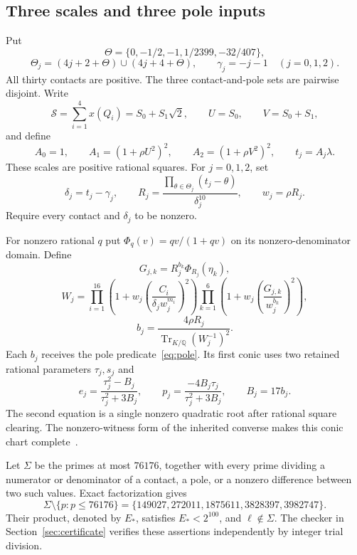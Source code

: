 \documentclass[11pt,a4paper]{article}
\newcommand{\Q}{\mathbb Q}\newcommand{\Z}{\mathbb Z}
\DeclareMathOperator{\Tr}{Tr}\DeclareMathOperator{\Nm}{N}
\begin{document}
\subsection{Three scales and three pole inputs}

Put
\[
 \Theta=\{0,-1/2,-1,1/2399,-32/407\},
\]
\[
 \Theta_j=(4j+2+\Theta)\cup(4j+4+\Theta),\qquad
 \gamma_j=-j-1\quad(j=0,1,2).
\]
All thirty contacts are positive. The three contact-and-pole sets
are pairwise disjoint. Write
\[
 \mathcal S=\sum_{i=1}^4x(Q_i)=S_0+S_1\sqrt2,
 \qquad U=S_0,\qquad V=S_0+S_1,
\]
and define
\begin{equation}\label{eq:scales}
 A_0=1,\qquad A_1=(1+\rho U^2)^2,\qquad
 A_2=(1+\rho V^2)^2,\qquad t_j=A_j\lambda.
\end{equation}
These scales are positive rational squares. For $j=0,1,2$, set
\begin{equation}\label{eq:contactfunctions}
 \delta_j=t_j-\gamma_j,\qquad
 R_j=\frac{\prod_{\theta\in\Theta_j}(t_j-\theta)}{\delta_j^{10}},
 \qquad w_j=\rho R_j.
\end{equation}
Require every contact and $\delta_j$ to be nonzero.

For nonzero rational $q$ put $\Phi_q(v)=qv/(1+qv)$ on its
nonzero-denominator domain. Define
\begin{equation}\label{eq:weights}
 G_{j,k}=R_j^{b_k}\Phi_{R_j}(\eta_k),
\end{equation}
\begin{equation}\label{eq:W}
 W_j=\prod_{i=1}^{16}
       \left(1+w_j\left(\frac{C_i}{\delta_jw_j^{m_i}}\right)^2\right)
     \prod_{k=1}^{6}
       \left(1+w_j\left(\frac{G_{j,k}}{w_j^{b_k}}\right)^2\right),
\end{equation}
\begin{equation}\label{eq:poleinputs}
                      b_j=\frac{4\rho R_j}{\Tr_{K/\Q}(W_j^{-1})^2}.
\end{equation}
Each $b_j$ receives the pole predicate~\eqref{eq:pole}. Its first
conic uses two retained rational parameters $\tau_j,s_j$ and
\[
 e_j=\frac{\tau_j^2-B_j}{\tau_j^2+3B_j},\qquad
 p_j=\frac{-4B_j\tau_j}{\tau_j^2+3B_j},\qquad B_j=17b_j.
\]
The second equation is a single nonzero quadratic root after rational
square clearing. The nonzero-witness form of the inherited converse
makes this conic chart complete~\cite{PointSource}.

Let $\Sigma$ be the primes at most $76176$, together with every
prime dividing a numerator or denominator of a contact, a pole, or
a nonzero difference between two such values. Exact factorization gives
\begin{equation}\label{eq:exceptional}
 \Sigma\setminus\{p:p\le76176\}
 =\{149027,272011,1875611,3828397,3982747\}.
\end{equation}
Their product, denoted by $E_*$, satisfies $E_*<2^{100}$, and
$\ell\notin\Sigma$. The checker in Section~\ref{sec:certificate}
verifies these assertions independently by integer trial division.
\end{document}
